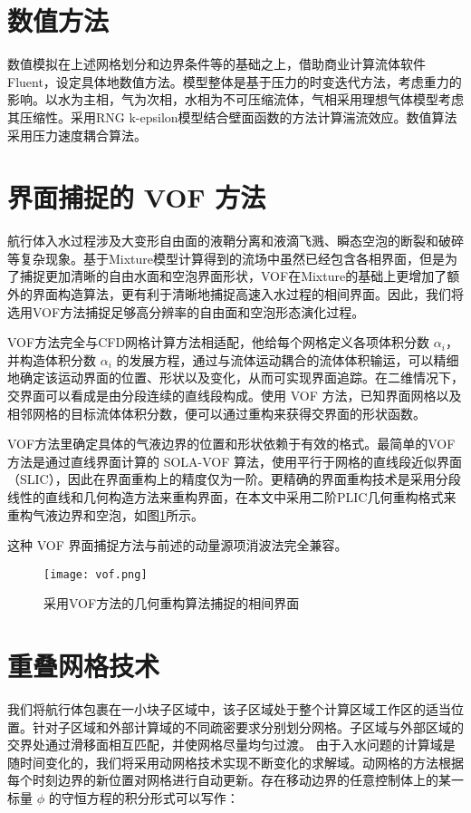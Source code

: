 \section{数值方法}
数值模拟在上述网格划分和边界条件等的基础之上，借助商业计算流体软件 Fluent，设定具体地数值方法。模型整体是基于压力的时变迭代方法，考虑重力的影响。以水为主相，气为次相，水相为不可压缩流体，气相采用理想气体模型考虑其压缩性。采用RNG k-epsilon模型结合壁面函数的方法计算湍流效应。数值算法采用压力速度耦合算法。

\section{界面捕捉的 VOF 方法}
航行体入水过程涉及大变形自由面的液鞘分离和液滴飞溅、瞬态空泡的断裂和破碎等复杂现象。基于Mixture模型计算得到的流场中虽然已经包含各相界面，但是为了捕捉更加清晰的自由水面和空泡界面形状，VOF在Mixture的基础上更增加了额外的界面构造算法，更有利于清晰地捕捉高速入水过程的相间界面。因此，我们将选用VOF方法捕捉足够高分辨率的自由面和空泡形态演化过程。

VOF方法完全与CFD网格计算方法相适配，他给每个网格定义各项体积分数 $\alpha _i$，并构造体积分数 $\alpha _i$ 的发展方程，通过与流体运动耦合的流体体积输运，可以精细地确定该运动界面的位置、形状以及变化，从而可实现界面追踪。在二维情况下，交界面可以看成是由分段连续的直线段构成。使用 VOF 方法，已知界面网格以及相邻网格的目标流体体积分数，便可以通过重构来获得交界面的形状函数。

VOF方法里确定具体的气液边界的位置和形状依赖于有效的格式。最简单的VOF方法是通过直线界面计算的 SOLA-VOF 算法，使用平行于网格的直线段近似界面（SLIC），因此在界面重构上的精度仅为一阶。更精确的界面重构技术是采用分段线性的直线和几何构造方法来重构界面，在本文中采用二阶PLIC几何重构格式来重构气液边界和空泡，如图\ref{fig:vof}所示。

这种 VOF 界面捕捉方法与前述的动量源项消波法完全兼容\cite{Li2013}。

\begin{figure}[!htp]
  \centering
  \texttt{[image: vof.png]}
  \caption{采用VOF方法的几何重构算法捕捉的相间界面}
  \label{fig:vof}
\end{figure}  
\section{重叠网格技术}


我们将航行体包裹在一小块子区域中，该子区域处于整个计算区域工作区的适当位置。针对子区域和外部计算域的不同疏密要求分别划分网格。子区域与外部区域的交界处通过滑移面相互匹配，并使网格尽量均匀过渡。
由于入水问题的计算域是随时间变化的，我们将采用动网格技术实现不断变化的求解域。动网格的方法根据每个时刻边界的新位置对网格进行自动更新。存在移动边界的任意控制体上的某一标量 $\phi$ 的守恒方程的积分形式可以写作：

